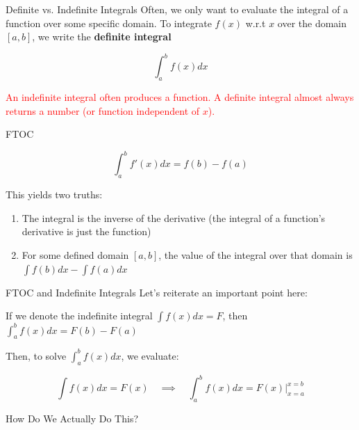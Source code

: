 \documentclass[10pt]{beamer}
\begin{document}
\begin{frame}{Definite vs. Indefinite Integrals}
    Often, we only want to evaluate the integral of a function over some specific domain. To integrate $f(x)$ w.r.t $x$ over the domain $[a,b]$, we write the \textbf{definite integral}

    \[\int_a^b f(x) dx\]

    \textcolor{red}{An indefinite integral often produces a function. A definite integral almost always returns a number (or function independent of $x$).}
\end{frame}

\begin{frame}{FTOC}

\[\int_a^b f'(x)dx = f(b) - f(a)\]

This yields two truths:

\begin{enumerate}
    \item The integral is the inverse of the derivative (the integral of a function's derivative is just the function)
    \item For some defined domain $[a,b]$, the value of the integral over that domain is $\int f(b)dx - \int f(a)dx$
\end{enumerate}

\end{frame}

\begin{frame}{FTOC and Indefinite Integrals}
    Let's reiterate an important point here: \\

    \vspace{.5cm}

    If we denote the indefinite integral $\int f(x)dx = F$, then $\int_a^b f(x)dx = F(b) - F(a)$ \\

    \vspace{.5cm}

    Then, to solve $\int_a^b f(x)dx$, we evaluate:

    \[\int f(x) dx = F(x) \quad \implies \quad \int_a^b f(x)dx = F(x) \bigg|_{x=a}^{x=b}\]
\end{frame}

\begin{frame}
    \thispagestyle{empty}
    \vspace{1cm}
    \begin{center}
        \begin{Huge}
            How Do We Actually Do This?
        \end{Huge}
    \end{center}
\end{frame}
\end{document}
